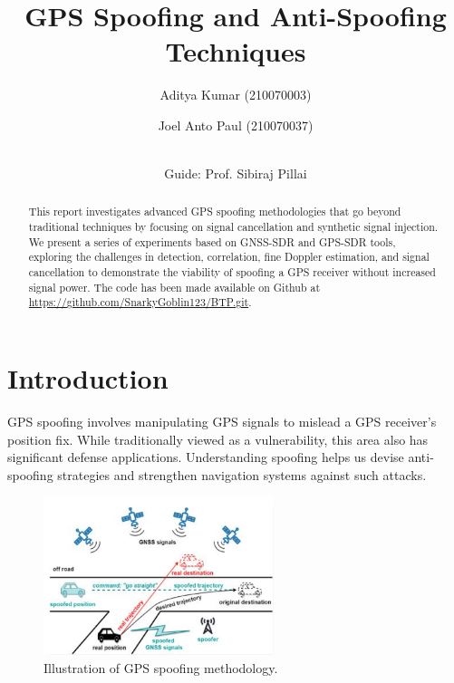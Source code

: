 \documentclass[12pt]{report}
\title{\textbf{GPS Spoofing and Anti-Spoofing Techniques}}
\author{Aditya Kumar (210070003) \and Joel Anto Paul (210070037) \\
\and \\
{\large Guide: Prof. Sibiraj Pillai}}
\date{}
\begin{document}
\maketitle

\begin{abstract}
This report investigates advanced GPS spoofing methodologies that go beyond traditional techniques by focusing on signal cancellation and synthetic signal injection. We present a series of experiments based on GNSS-SDR and GPS-SDR tools, exploring the challenges in detection, correlation, fine Doppler estimation, and signal cancellation to demonstrate the viability of spoofing a GPS receiver without increased signal power.
The code has been made available on Github at \url{https://github.com/SnarkyGoblin123/BTP.git}.
\end{abstract}

\section{Introduction}
GPS spoofing involves manipulating GPS signals to mislead a GPS receiver's position fix. While traditionally viewed as a vulnerability, this area also has significant defense applications. Understanding spoofing helps us devise anti-spoofing strategies and strengthen navigation systems against such attacks.
\begin{figure}[H]
    \centering
    \includegraphics[width=0.6\textwidth]{spoof.png}
    \caption{Illustration of GPS spoofing methodology.}
    \label{fig:spoofing}
\end{figure}
\end{document}
